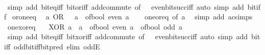 \begin{isabellebody}
%
\isadelimproof
\ \ %
\endisadelimproof
%
\isatagproof
{}\isamarkupfalse%
\ {\isacharparenleft}{\kern0pt}simp\ add{\isacharcolon}{\kern0pt}\ bit{\isacharunderscore}{\kern0pt}eq{\isacharunderscore}{\kern0pt}iff\ bit{\isacharunderscore}{\kern0pt}or{\isacharunderscore}{\kern0pt}iff\ add{\isachardot}{\kern0pt}commute\ {\isacharbrackleft}{\kern0pt}of\ {\isacharunderscore}{\kern0pt}\ {}{\isacharbrackright}{\kern0pt}\ even{\isacharunderscore}{\kern0pt}bit{\isacharunderscore}{\kern0pt}succ{\isacharunderscore}{\kern0pt}iff{\isacharparenright}{\kern0pt}\ {\isacharparenleft}{\kern0pt}auto\ simp\ add{\isacharcolon}{\kern0pt}\ bit{\isacharunderscore}{\kern0pt}{}{\isacharunderscore}{\kern0pt}iff{\isacharparenright}{\kern0pt}%
\endisatagproof
{\isafoldproof}%
%
\isadelimproof
\isanewline
%
\endisadelimproof
\isanewline
{}\isamarkupfalse%
\ or{\isacharunderscore}{\kern0pt}one{\isacharunderscore}{\kern0pt}eq{\isacharcolon}{\kern0pt}\isanewline
\ \ {\isacartoucheopen}a\ OR\ {}\ {\isacharequal}{\kern0pt}\ a\ {\isacharplus}{\kern0pt}\ of{\isacharunderscore}{\kern0pt}bool\ {\isacharparenleft}{\kern0pt}even\ a{\isacharparenright}{\kern0pt}{\isacartoucheclose}\isanewline
%
\isadelimproof
\ \ %
\endisadelimproof
%
\isatagproof
{}\isamarkupfalse%
\ one{\isacharunderscore}{\kern0pt}or{\isacharunderscore}{\kern0pt}eq\ {\isacharbrackleft}{\kern0pt}of\ a{\isacharbrackright}{\kern0pt}\ \isamarkupfalse%
\ {\isacharparenleft}{\kern0pt}simp\ add{\isacharcolon}{\kern0pt}\ ac{\isacharunderscore}{\kern0pt}simps{\isacharparenright}{\kern0pt}%
\endisatagproof
{\isafoldproof}%
%
\isadelimproof
\isanewline
%
\endisadelimproof
\isanewline
{}\isamarkupfalse%
\ one{\isacharunderscore}{\kern0pt}xor{\isacharunderscore}{\kern0pt}eq{\isacharcolon}{\kern0pt}\isanewline
\ \ {\isacartoucheopen}{}\ XOR\ a\ {\isacharequal}{\kern0pt}\ a\ {\isacharplus}{\kern0pt}\ of{\isacharunderscore}{\kern0pt}bool\ {\isacharparenleft}{\kern0pt}even\ a{\isacharparenright}{\kern0pt}\ {\isacharminus}{\kern0pt}\ of{\isacharunderscore}{\kern0pt}bool\ {\isacharparenleft}{\kern0pt}odd\ a{\isacharparenright}{\kern0pt}{\isacartoucheclose}\isanewline
%
\isadelimproof
\ \ %
\endisadelimproof
%
\isatagproof
{}\isamarkupfalse%
\ {\isacharparenleft}{\kern0pt}simp\ add{\isacharcolon}{\kern0pt}\ bit{\isacharunderscore}{\kern0pt}eq{\isacharunderscore}{\kern0pt}iff\ bit{\isacharunderscore}{\kern0pt}xor{\isacharunderscore}{\kern0pt}iff\ add{\isachardot}{\kern0pt}commute\ {\isacharbrackleft}{\kern0pt}of\ {\isacharunderscore}{\kern0pt}\ {}{\isacharbrackright}{\kern0pt}\ even{\isacharunderscore}{\kern0pt}bit{\isacharunderscore}{\kern0pt}succ{\isacharunderscore}{\kern0pt}iff{\isacharparenright}{\kern0pt}\ {\isacharparenleft}{\kern0pt}auto\ simp\ add{\isacharcolon}{\kern0pt}\ bit{\isacharunderscore}{\kern0pt}{}{\isacharunderscore}{\kern0pt}iff\ odd{\isacharunderscore}{\kern0pt}bit{\isacharunderscore}{\kern0pt}iff{\isacharunderscore}{\kern0pt}bit{\isacharunderscore}{\kern0pt}pred\ elim{\isacharcolon}{\kern0pt}\ oddE{\isacharparenright}{\kern0pt}%

\end{isabellebody}
